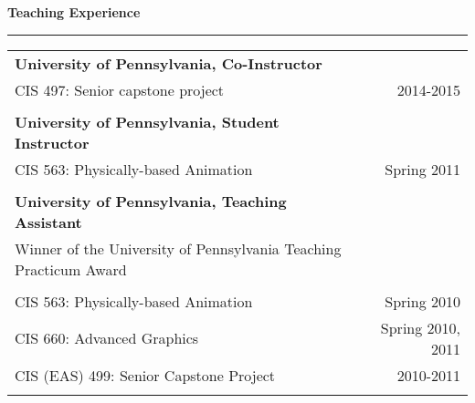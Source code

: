 \needspace{6em}
{\large {\bf Teaching Experience}}
\vspace{0.1cm}
\hrule
\begin{tabular*}{7.1in}{@{}l@{\extracolsep\fill}r}

{\bf University of Pennsylvania, Co-Instructor} & \\
CIS 497: Senior capstone project & 2014-2015\\
\phantom{yommomma} & \phantom{2002}\\

{\bf University of Pennsylvania, Student Instructor} & \\
CIS 563: Physically-based Animation & Spring 2011\\
\phantom{yommomma} & \phantom{2002}\\
{\bf University of Pennsylvania, Teaching Assistant} & \\
Winner of the University of Pennsylvania Teaching Practicum Award & \\
\phantom{yommomma} & \phantom{2002}\\
CIS 563: Physically-based Animation & Spring 2010\\
CIS 660: Advanced Graphics & Spring 2010, 2011\\
CIS (EAS) 499: Senior Capstone Project  & 2010-2011\\
\phantom{yommomma} & \phantom{2002}\\
\end{tabular*}



